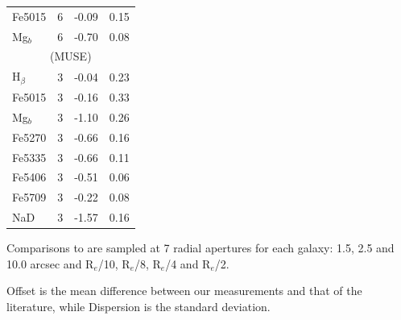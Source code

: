 \begin{table}
\begin{threeparttable}
\begin{tabular}{l r r r}
			Fe5015 		& 6 		& -0.09		& 0.15	\\
			Mg$_b$ 		& 6 		& -0.70		& 0.08	\\
			\hline
			\multicolumn{4}{c}{\citet{Ogando2008} (MUSE)} \\
			\hline
			H$_\beta$ 	& 3 		& -0.04		& 0.23	\\ 
			Fe5015 		& 3 		& -0.16		& 0.33	\\ 
			Mg$_b$ 		& 3 		& -1.10		& 0.26	\\
			Fe5270 		& 3 		& -0.66		& 0.16	\\
			Fe5335 		& 3 		& -0.66		& 0.11	\\
			Fe5406 		& 3 		& -0.51		& 0.06	\\
			Fe5709 		& 3 		& -0.22		& 0.08	\\
			NaD 		& 3 		& -1.57		& 0.16	\\
			\hline
		\end{tabular}
		\begin{tablenotes}
		\footnotesize
		\item Comparisons to \citet{Rampazzo2005} are sampled at 7 radial apertures for each galaxy: 1.5, 2.5 and 10.0 arcsec and R$_e$/10, R$_e$/8, R$_e$/4 and R$_e$/2. 
		\item Offset is the mean difference between our measurements and that of the literature, while Dispersion is the standard deviation.
		\end{tablenotes}
	\end{threeparttable}
	\end{table}


